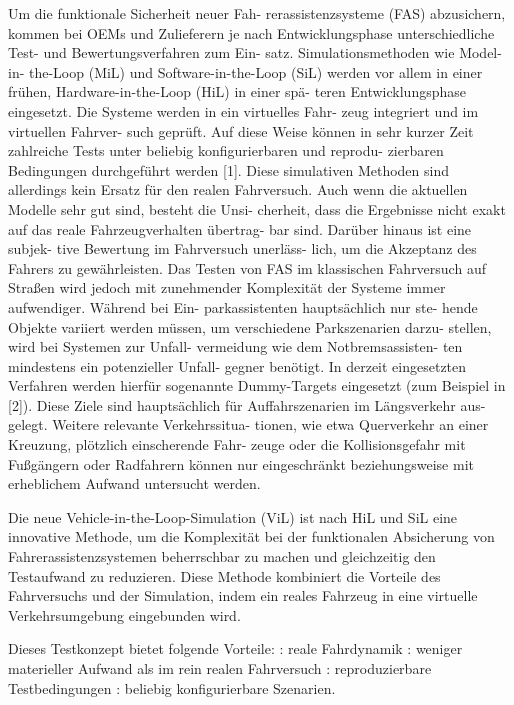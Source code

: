 Um die funktionale Sicherheit neuer Fah- rerassistenzsysteme (FAS) abzusichern, kommen bei OEMs und Zulieferern je nach Entwicklungsphase unterschiedliche Test- und Bewertungsverfahren zum Ein- satz. Simulationsmethoden wie Model-in- the-Loop (MiL) und Software-in-the-Loop (SiL) werden vor allem in einer frühen, Hardware-in-the-Loop (HiL) in einer spä- teren Entwicklungsphase eingesetzt. Die Systeme werden in ein virtuelles Fahr- zeug integriert und im virtuellen Fahrver- such geprüft. Auf diese Weise können in sehr kurzer Zeit zahlreiche Tests unter beliebig konfigurierbaren und reprodu- zierbaren Bedingungen durchgeführt werden [1]. Diese simulativen Methoden sind allerdings kein Ersatz für den realen Fahrversuch. Auch wenn die aktuellen Modelle sehr gut sind, besteht die Unsi- cherheit, dass die Ergebnisse nicht exakt auf das reale Fahrzeugverhalten übertrag- bar sind. Darüber hinaus ist eine subjek- tive Bewertung im Fahrversuch unerläss- lich, um die Akzeptanz des Fahrers zu gewährleisten. Das Testen von FAS im klassischen Fahrversuch auf Straßen wird jedoch mit zunehmender Komplexität der Systeme immer aufwendiger. Während bei Ein- parkassistenten hauptsächlich nur ste- hende Objekte variiert werden müssen, um verschiedene Parkszenarien darzu- stellen, wird bei Systemen zur Unfall- vermeidung wie dem Notbremsassisten- ten mindestens ein potenzieller Unfall- gegner benötigt. In derzeit eingesetzten Verfahren werden hierfür sogenannte Dummy-Targets eingesetzt (zum Beispiel in [2]). Diese Ziele sind hauptsächlich für Auffahrszenarien im Längsverkehr aus- gelegt. Weitere relevante Verkehrssitua- tionen, wie etwa Querverkehr an einer Kreuzung, plötzlich einscherende Fahr- zeuge oder die Kollisionsgefahr mit Fußgängern oder Radfahrern können nur eingeschränkt beziehungsweise mit erheblichem Aufwand untersucht werden. \cite{schwab2014durchgangige}

Die neue Vehicle-in-the-Loop-Simulation (ViL) ist nach HiL und SiL eine innovative Methode, um die Komplexität bei der funktionalen Absicherung von Fahrerassistenzsystemen beherrschbar zu machen und gleichzeitig den Testaufwand zu reduzieren. Diese Methode kombiniert die Vorteile des Fahrversuchs und der Simulation, indem ein reales Fahrzeug in eine virtuelle Verkehrsumgebung eingebunden wird. \cite{schwab2014durchgangige}

Dieses Testkonzept bietet folgende Vorteile:
: reale Fahrdynamik
: weniger materieller Aufwand als im rein realen Fahrversuch
: reproduzierbare Testbedingungen
: beliebig konfigurierbare Szenarien. 

